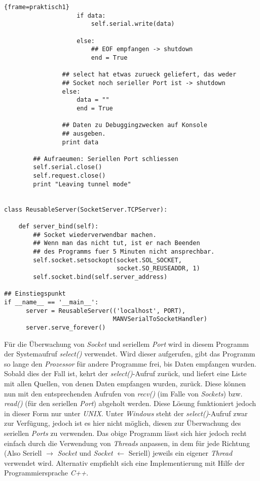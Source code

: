 \begin{lstlisting}{frame=praktisch1}
                    if data:
                        self.serial.write(data)

                    else:
                        ## EOF empfangen -> shutdown
                        end = True

                ## select hat etwas zurueck geliefert, das weder 
                ## Socket noch serieller Port ist -> shutdown
                else:
                    data = ""
                    end = True

                ## Daten zu Debuggingzwecken auf Konsole 
                ## ausgeben.
                print data

        ## Aufraeumen: Seriellen Port schliessen 
        self.serial.close()
        self.request.close()
        print "Leaving tunnel mode"


class ReusableServer(SocketServer.TCPServer):

    def server_bind(self):
        ## Socket wiederverwendbar machen.
        ## Wenn man das nicht tut, ist er nach Beenden 
        ## des Programms fuer 5 Minuten nicht ansprechbar.
        self.socket.setsockopt(socket.SOL_SOCKET,
                               socket.SO_REUSEADDR, 1)
        self.socket.bind(self.server_address)

## Einstiegspunkt 
if __name__ == '__main__':
      server = ReusableServer(('localhost', PORT), 
                              MANVSerialToSocketHandler)
      server.serve_forever()
\end{lstlisting}

Für die Überwachung von \emph{Socket} und seriellem \emph{Port} wird in diesem Programm der Systemaufruf
\emph{select()} verwendet. Wird dieser aufgerufen, gibt das Programm so lange den \emph{Prozessor}
für andere Programme frei, bis Daten empfangen wurden. Sobald dies der Fall ist, kehrt
der \emph{select()}-Aufruf zurück, und liefert eine Liste mit allen Quellen, von denen Daten
empfangen wurden, zurück. Diese können nun mit den entsprechenden Aufrufen von \emph{recv()} 
(im Falle von \emph{Sockets}) bzw. \emph{read()} (für den seriellen \emph{Port}) abgeholt werden.
Diese Lösung funktioniert jedoch in dieser Form nur unter \emph{UNIX}. Unter \emph{Windows} steht der 
\emph{select()}-Aufruf zwar zur Verfügung, jedoch ist es hier nicht möglich, diesen zur
Überwachung des seriellen \emph{Ports} zu verwenden. Das obige Programm lässt sich hier jedoch
recht einfach durch die Verwendung von \emph{Threads} anpassen, in dem für jede Richtung (Also
Seriell $\rightarrow{}$ \emph{Socket} und \emph{Socket} $\leftarrow{}$ Seriell) jeweils ein eigener \emph{Thread} verwendet
wird. Alternativ empfiehlt sich eine Implementierung mit Hilfe der Programmiersprache \emph{C++}.

